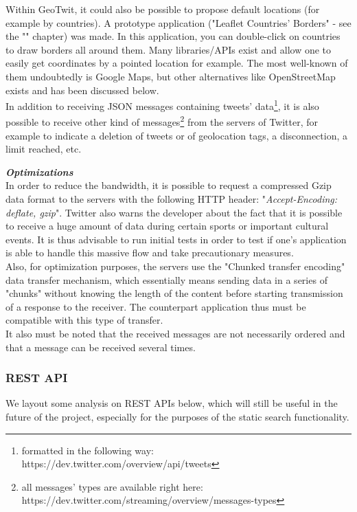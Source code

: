 \documentclass[a4paper,11pt]{report}
\begin{document}
Within GeoTwit, it could also be possible to propose default locations (for example by countries). A prototype application ("Leaflet Countries' Borders" - see the "" chapter) was made. In this application, you can double-click on countries to draw borders all around them. Many libraries/APIs exist and allow one to easily get coordinates by a pointed location for example. The most well-known of them undoubtedly is Google Maps, but other alternatives like OpenStreetMap exists and has been discussed below.\\

In addition to receiving JSON messages containing tweets' data\footnote{formatted in the following way:  https://dev.twitter.com/overview/api/tweets}, it is also possible to receive other kind of messages\footnote{all messages' types are available right here: https://dev.twitter.com/streaming/overview/messages-types} from the servers of Twitter, for example to indicate a deletion of tweets or of geolocation tags, a disconnection, a limit reached, etc.\\
\newpage

\textbf{\emph{Optimizations}}\\
In order to reduce the bandwidth, it is possible to request a compressed Gzip data format to the servers with the following HTTP header: "\emph{Accept-Encoding: deflate, gzip}". Twitter also warns the developer about the fact that it is possible to receive a huge amount of data during certain sports or important cultural events. It is thus advisable to run initial tests in order to test if one's application is able to handle this massive flow and take precautionary measures.\\

Also, for optimization purposes, the servers use the "Chunked transfer encoding" data transfer mechanism, which essentially means sending data in a series of "chunks" without knowing the length of the content before starting transmission of a response to the receiver. The counterpart application thus must be compatible with this type of transfer.\\

It also must be noted that the received messages are not necessarily ordered and that a message can be received several times.

\subsubsection{REST API}
We layout some analysis on REST APIs below, which will still be useful in the future of the project, especially for the purposes of the static search functionality.\\
\end{document}
